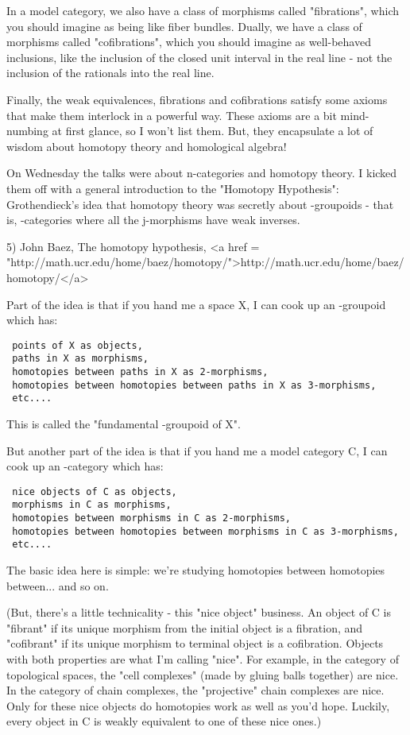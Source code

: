 In a model category, we also have a class of morphisms called
"fibrations", which you should imagine as being like fiber
bundles.  Dually, we have a class of morphisms called
"cofibrations", which you should imagine as well-behaved
inclusions, like the inclusion of the closed unit interval in the real
line - not the inclusion of the rationals into the real line.

Finally, the weak equivalences, fibrations and cofibrations 
satisfy some axioms that make them interlock in a powerful way.
These axioms are a bit mind-numbing at first glance, so I won't
list them.  But, they encapsulate a lot of wisdom about homotopy
theory and homological algebra!  

On Wednesday the talks were about n-categories and homotopy theory.  I
kicked them off with a general introduction to the "Homotopy
Hypothesis": Grothendieck's idea that homotopy theory was
secretly about \infty -groupoids - that is, \infty -categories where
all the j-morphisms have weak inverses.

5) John Baez, The homotopy hypothesis, 
<a href = "http://math.ucr.edu/home/baez/homotopy/">http://math.ucr.edu/home/baez/homotopy/</a>

Part of the idea is that if you hand me a space X, I can cook up 
an \infty -groupoid which has:

\begin{verbatim}
 points of X as objects,
 paths in X as morphisms,
 homotopies between paths in X as 2-morphisms,
 homotopies between homotopies between paths in X as 3-morphisms,
 etc....
\end{verbatim}
    

This is called the "fundamental \infty -groupoid of X".

But another part of the idea is that if you hand me a model 
category C, I can cook up an \infty -category which has:

\begin{verbatim}
 nice objects of C as objects,
 morphisms in C as morphisms,
 homotopies between morphisms in C as 2-morphisms,
 homotopies between homotopies between morphisms in C as 3-morphisms,
 etc....
\end{verbatim}
    
The basic idea here is simple: we're studying homotopies between
homotopies between... and so on.

(But, there's a little technicality - this "nice object"
business.  An object of C is "fibrant" if its unique
morphism from the initial object is a fibration, and
"cofibrant" if its unique morphism to terminal object is a
cofibration.  Objects with both properties are what I'm calling
"nice".  For example, in the category of topological spaces,
the "cell complexes" (made by gluing balls together) are
nice.  In the category of chain complexes, the "projective"
chain complexes are nice.  Only for these nice objects do homotopies
work as well as you'd hope.  Luckily, every object in C is weakly
equivalent to one of these nice ones.)

